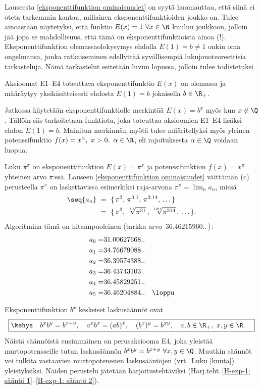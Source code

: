 Lauseesta \ref{eksponenttifunktion ominaisuudet} on syytä huomauttaa, että siinä ei oteta
tarkemmin kantaa, millainen eksponenttifunktioiden joukko on. Tulee ainoastaan näytetyksi,
että funktio $E(x)=1\ \forall x\in\R$ kuuluu joukkoon, jolloin jää jopa se mahdollisuus, että
tämä on eksponenttifunktioista ainoa (!). Eksponenttifunktion olemassaolokysymys ehdolla
$E(1)=b \neq 1$ onkin oma ongelmansa, jonka ratkaiseminen edellyttää syvällisempiä
lukujonoteoreettisia tarkasteluja. Nämä tarkastelut esitetään luvun lopussa, jolloin tulee
todistetuksi
\begin{*Lause} \label{eksponenttifunktion olemassaolo} Aksioomat E1--E4 toteuttava
eksponenttifunktio $E(x)$ on olemassa ja määräytyy yksikäsitteisesti ehdosta $E(1)=b$
jokaisella $b\in\R_+$.
\end{*Lause}
Jatkossa käytetään eksponenttifunktiolle merkintää $E(x)=b^x$ myös kun $x\not\in\Q$. Tällöin
siis tarkoitetaan funktiota, joka toteuttaa aksioomien E1--E4 lisäksi ehdon $E(1)=b$.
Mainitun merkinnän myötä tulee määritellyksi myös yleinen potenssifunktio
$f(x)=x^\alpha,\ x>0,\ \alpha\in\R$, eli rajoituksesta $\alpha\in\Q$ voidaan luopua.
\begin{Exa} Luku $\pi^\pi$ on eksponenttifunktion $E(x)=\pi^x$ ja potenssifunktion
$f(x)=x^\pi$ yhteinen arvo $\pi$:ssä. Lauseen \ref{eksponenttifunktion ominaisuudet} väittämän
(c) perusteella $\pi^\pi$ on laskettavissa esimerkiksi raja-arvona $\pi^\pi=\lim_n a_n$, missä
\begin{align*}
\seq{a_n}\ &=\ \{\,\pi^3,\,\pi^{3.1},\,\pi^{3.14},\,\ldots\,\} \\
           &=\ \{\,\pi^3,\,\sqrt[10]{\pi^{31}}\,,\,\sqrt[100]{\pi^{314}}\,,\,\ldots\,\}.
\end{align*}
Algoritmina tämä on hitaanpuoleinen (tarkka arvo $\,36.46215960..\,$)\,:
\begin{align*}
a_0 = &31.00627668.. \\
a_1 = &34.76679088.. \\
a_2 = &36.39574388.. \\
a_3 = &36.43743103.. \\
a_4 = &36.45829251.. \\
a_5 = &36.46204884.. \quad \loppu
\end{align*}
\end{Exa}

Eksponenttifunktion $b^x$ keskeiset laskusäännöt ovat
\[
\boxed{\kehys\quad b^xb^y=b^{x+y}, \quad a^xb^x=(ab)^x, \quad(b^x)^y=b^{xy},
                                                       \quad a,b\in\R_+,\ x,y\in\R. \quad}
\]
Näistä säännöistä ensimmäinen on perusaksiooma E4, joka yleistää murtopotensseille tutun
laskusäännön $b^xb^y=b^{x+y}\ \forall x,y\in\Q$. Muutkin säännöt voi tulkita vastaavien
murtopotenssien laskusääntöjen (vrt.\ Luku \ref{kunta}) yleistyksiksi. Näiden perustelu
jätetään harjoitustehtäviksi (Harj.teht.\,\ref{H-exp-1: sääntö 1}--\ref{H-exp-1: sääntö 2}).

